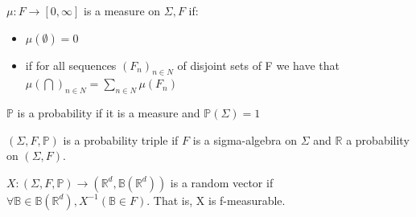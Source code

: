 \documentclass{article}
\begin{document}
\begin{definition}
    \(\mu: F \rightarrow [0, \infty]\) is a measure on \(\Sigma, F\) if: \begin{itemize}
        \item \(\mu(\emptyset)=0\)
        \item if for all sequences \((F_{n})_{n \in N}\) of disjoint sets of F we have that \(\mu(\bigcap)_{n \in N}=\sum_{n \in N}\mu(F_{n})\)
    \end{itemize}
\end{definition}

\begin{definition}
    $\mathbb{P}$ is a probability if it is a measure and  $\mathbb{P}(\Sigma)=1$
\end{definition}

\begin{definition}
    \((\Sigma, F, \mathbb{P})\) is a probability triple if $F$ is a sigma-algebra on $\Sigma$ and $\mathbb{R}$ a probability on \((\Sigma, F)\).
\end{definition}

\begin{definition}
\(X:(\Sigma, F, \mathbb{P})\rightarrow (\mathbb{R}^{d}, \mathbb{B}(\mathbb{R}^{d}))\) is a random vector if \(\forall \mathbb{B} \in \mathbb{B}(\mathbb{R}^{d}) , X^{-1}(\mathbb{B} \in F) \). That is, X is f-measurable. 
\end{definition}
\end{document}
